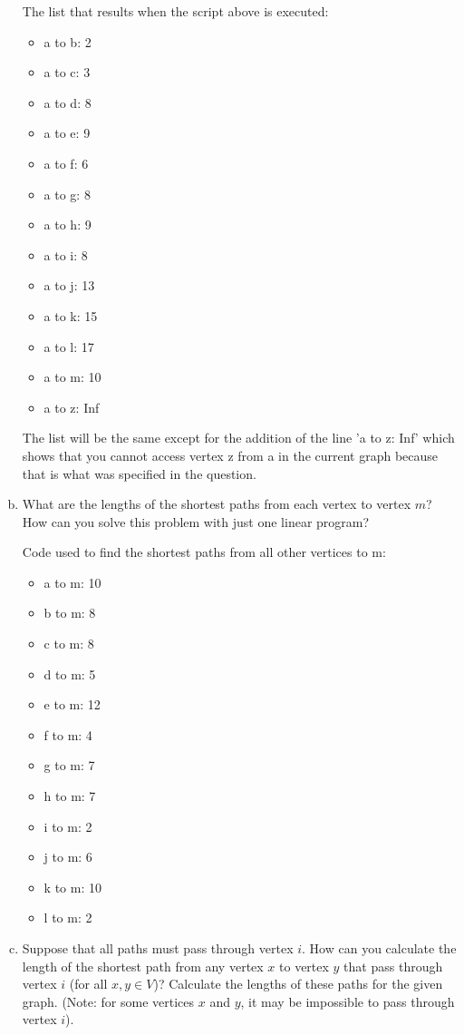 \documentclass[../report/main.tex]{subfiles}
\begin{document}
\begin{enumerate}[a)]
    The list that results when the script above is executed:

    \begin{itemize}
        \item a to b: 2
        \item a to c: 3
        \item a to d: 8
        \item a to e: 9
        \item a to f: 6
        \item a to g: 8
        \item a to h: 9
        \item a to i: 8
        \item a to j: 13
        \item a to k: 15
        \item a to l: 17
        \item a to m: 10
        \item a to z: Inf
    \end{itemize}

    The list will be the same except for the addition of the line 'a to z: Inf' which shows that you cannot access vertex z from a in the current graph because that is what was specified in the question.

	\item What are the lengths of the shortest paths from each vertex to vertex $m$? How can you solve this problem with just one linear program?

    Code used to find the shortest paths from all other vertices to m:

    

    \begin{itemize}
        \item a to m: 10
        \item b to m: 8
        \item c to m: 8
        \item d to m: 5
        \item e to m: 12
        \item f to m: 4
        \item g to m: 7
        \item h to m: 7
        \item i to m: 2
        \item j to m: 6
        \item k to m: 10
        \item l to m: 2
    \end{itemize}

	\item Suppose that all paths must pass through vertex $i$. How can you calculate the length of the shortest path from any vertex $x$ to vertex $y$ that pass through vertex $i$ (for all $x, y \in V$)? Calculate the lengths of these paths for the given graph. (Note: for some vertices $x$ and $y$, it may be impossible to pass through vertex $i$).
\end{enumerate}
\end{document}
